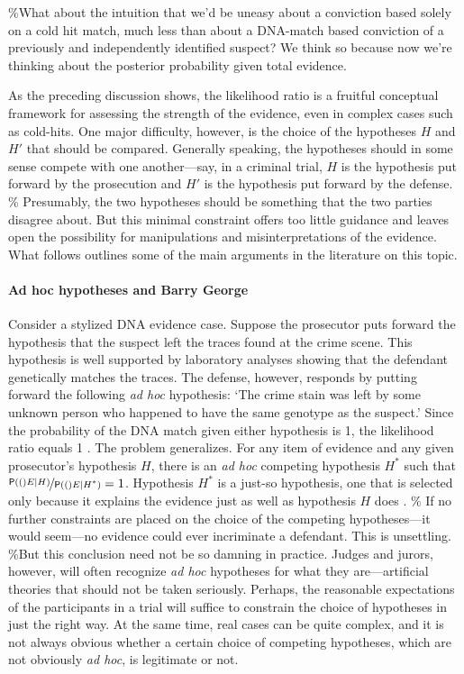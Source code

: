 \documentclass[10pt,dvipsnames,enabledeprecatedfontcommands]{scrartcl}
\let\oldparagraph\paragraph
\renewcommand{\paragraph}[1]{\oldparagraph{#1}\mbox{}}
\newcommand{\pr}[1]{\mathsf{P}(#1)}
\begin{document}
\%What about the intuition that we'd be uneasy about a conviction based
solely on a cold hit match, much less than about a DNA-match based
conviction of a previously and independently identified suspect? We
think so because now we're thinking about the posterior probability
given total evidence.

As the preceding discussion shows, the likelihood ratio is a fruitful
conceptual framework for assessing the strength of the evidence, even in
complex cases such as cold-hits. One major difficulty, however, is the
choice of the hypotheses \(H\) and \(H'\) that should be compared.
Generally speaking, the hypotheses should in some sense compete with one
another---say, in a criminal trial, \(H\) is the hypothesis put forward
by the prosecution and \(H'\) is the hypothesis put forward by the
defense. \% Presumably, the
two hypotheses should be something that the two parties disagree about.
But this minimal constraint offers too little guidance and leaves open
the possibility for manipulations and misinterpretations of the
evidence. What follows outlines some of the main arguments in the
literature on this topic.

\paragraph{Ad hoc hypotheses and Barry George}

Consider a stylized DNA evidence case. Suppose the prosecutor puts
forward the hypothesis that the suspect left the traces found at the
crime scene. This hypothesis is well supported by laboratory analyses
showing that the defendant genetically matches the traces. The defense,
however, responds by putting forward the following \textit{ad hoc}
hypothesis: `The crime stain was left by some unknown person who
happened to have the same genotype as the suspect.' Since the
probability of the DNA match given either hypothesis is 1, the
likelihood ratio equals 1 \citep{evett2000MoreHierarchyPropositions}.
The problem generalizes. For any item of evidence and any given
prosecutor's hypothesis \(H\), there is an \textit{ad hoc} competing
hypothesis \(H^*\) such that
\(\nicefrac{\pr(E \vert H)}{\pr(E \vert H^*)}=1\). Hypothesis \(H^*\) is
a just-so hypothesis, one that is selected only because it explains the
evidence just as well as hypothesis \(H\) does \citep{mayo2018}. \% If
no further constraints are placed on the choice of the competing
hypotheses---it would seem---no evidence could ever incriminate a
defendant. This is unsettling. \%But this conclusion need not be so
damning in practice. Judges and jurors, however, will often recognize
\textit{ad hoc} hypotheses for what they are---artificial theories that
should not be taken seriously. Perhaps, the reasonable expectations of
the participants in a trial will suffice to constrain the choice of
hypotheses in just the right way. At the same time, real cases can be
quite complex, and it is not always obvious whether a certain choice of
competing hypotheses, which are not obviously \textit{ad hoc}, is
legitimate or not.
\end{document}
